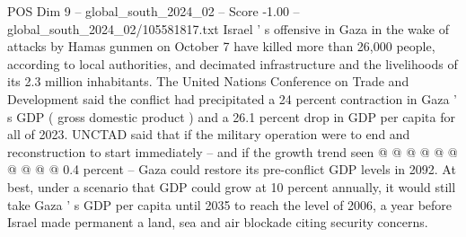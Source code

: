 \begin{textsample}{POS Dim 9 – global\_south\_2024\_02 – Score -1.00 – global\_south\_2024\_02/105581817.txt}
Israel ' s offensive in Gaza in the wake of attacks by Hamas gunmen on October 7 have killed more than 26,000 people, according to local authorities, and decimated infrastructure and the livelihoods of its 2.3 million inhabitants.
The United Nations Conference on Trade and Development said the conflict had precipitated a 24 percent contraction in Gaza ' s GDP ( gross domestic product ) and a 26.1 percent drop in GDP per capita for all of 2023.
UNCTAD said that if the military operation were to end and reconstruction to start immediately -- and if the growth trend seen @ @ @ @ @ @ @ @ @ @ 0.4 percent -- Gaza could restore its pre-conflict GDP levels in 2092.
At best, under a scenario that GDP could grow at 10 percent annually, it would still take Gaza ' s GDP per capita until 2035 to reach the level of 2006, a year before Israel made permanent a land, sea and air blockade citing security concerns.

\end{textsample}
